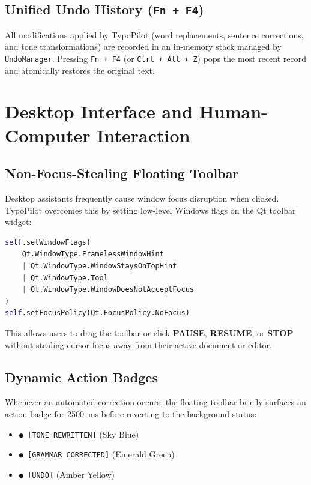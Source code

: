 \documentclass[11pt,a4paper]{article}
\begin{document}
\subsection{Unified Undo History (\texttt{Fn + F4})}
All modifications applied by TypoPilot (word replacements, sentence corrections, and tone transformations) are recorded in an in-memory stack managed by \texttt{UndoManager}. Pressing \texttt{Fn + F4} (or \texttt{Ctrl + Alt + Z}) pops the most recent record and atomically restores the original text.

\section{Desktop Interface and Human-Computer Interaction}

\subsection{Non-Focus-Stealing Floating Toolbar}
Desktop assistants frequently cause window focus disruption when clicked. TypoPilot overcomes this by setting low-level Windows flags on the Qt toolbar widget:
\begin{lstlisting}[language=Python]
self.setWindowFlags(
    Qt.WindowType.FramelessWindowHint
    | Qt.WindowType.WindowStaysOnTopHint
    | Qt.WindowType.Tool
    | Qt.WindowType.WindowDoesNotAcceptFocus
)
self.setFocusPolicy(Qt.FocusPolicy.NoFocus)
\end{lstlisting}
This allows users to drag the toolbar or click \textbf{PAUSE}, \textbf{RESUME}, or \textbf{STOP} without stealing cursor focus away from their active document or editor.

\subsection{Dynamic Action Badges}
Whenever an automated correction occurs, the floating toolbar briefly surfaces an action badge for 2500~ms before reverting to the background status:
\begin{itemize}[noitemsep]
    \item \texttt{● [TONE REWRITTEN]} (Sky Blue)
    \item \texttt{● [GRAMMAR CORRECTED]} (Emerald Green)
    \item \texttt{● [UNDO]} (Amber Yellow)
\end{itemize}
\end{document}
